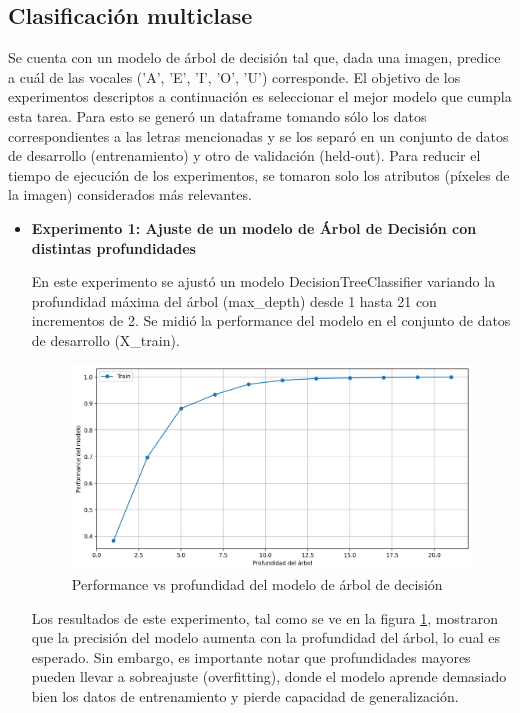 \documentclass[11pt,a4paper, twocolumn]{article}
\begin{document}
\subsection{Clasificación multiclase}
Se cuenta con un modelo de árbol de decisión tal que, dada una imagen, predice a cuál de las vocales ('A', 'E', 'I', 'O', 'U') corresponde. El objetivo de los experimentos descriptos a continuación es seleccionar el mejor modelo que cumpla esta tarea. Para esto se generó un dataframe tomando sólo los datos correspondientes a las letras mencionadas y se los separó en un conjunto de datos de desarrollo (entrenamiento) y otro de validación (held-out). Para reducir el tiempo de ejecución de los experimentos, se tomaron solo los atributos (píxeles de la imagen) considerados más relevantes.

\begin{itemize}
	\item[]
	\textbf{Experimento 1: Ajuste de un modelo de Árbol de Decisión con distintas profundidades}

En este experimento se ajustó un modelo DecisionTreeClassifier variando la profundidad máxima del árbol (max\_depth) desde 1 hasta 21 con incrementos de 2. Se midió la performance del modelo en el conjunto de datos de desarrollo (X\_train).

\begin{figure}[H]
	\centering
	\includegraphics[scale=0.6]{figuras/3b.png}
	\caption{Performance vs profundidad del modelo de árbol de decisión}
	\label{fig:3b}
\end{figure}

Los resultados de este experimento, tal como se ve en la figura \ref{fig:3b}, mostraron que la precisión del modelo aumenta con la profundidad del árbol, lo cual es esperado. Sin embargo, es importante notar que profundidades mayores pueden llevar a sobreajuste (overfitting), donde el modelo aprende demasiado bien los datos de entrenamiento y pierde capacidad de generalización. 


\end{itemize}
\end{document}

